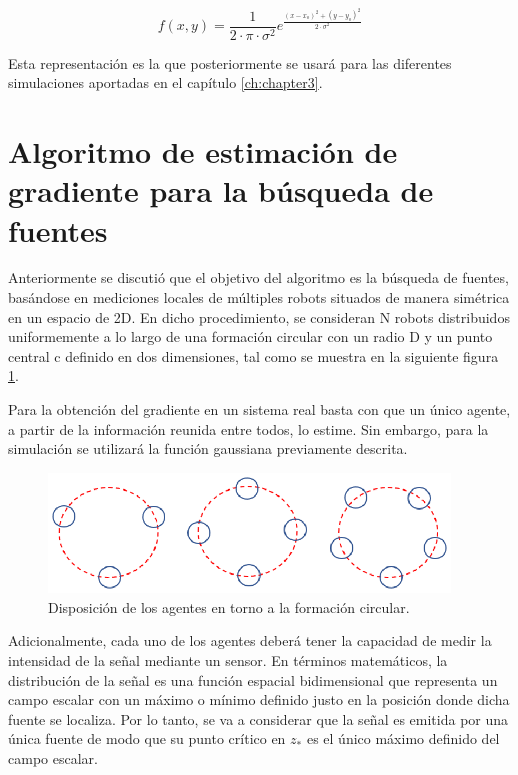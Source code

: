 \begin{equation}
	f\left(x,y\right)=\frac{1}{2\cdot{\pi}\cdot{\sigma^{2}}}e^{\frac{\left(x-x_{o}\right)^{2}+\left(y-y_{o}\right)^{2}}{2\cdot{\sigma^2}}}
\end{equation}

Esta representación es la que posteriormente se usará para las diferentes simulaciones aportadas en el capítulo \ref{ch:chapter3}. 

\section{Algoritmo de estimación de gradiente para la búsqueda de fuentes} \label{Estima}

Anteriormente se discutió que el objetivo del algoritmo es la búsqueda de fuentes, basándose en mediciones locales de múltiples robots situados de manera simétrica en un espacio de 2D. En dicho procedimiento, se consideran N robots distribuidos uniformemente a lo largo de una formación circular con un radio D y un punto central c definido en dos dimensiones, tal como se muestra en la siguiente figura \ref{Disp:Robots}.

Para la obtención del gradiente en un sistema real basta con que un único agente, a partir de la información reunida entre todos, lo estime. Sin embargo, para la simulación se utilizará la función gaussiana previamente descrita.

\begin{figure}[htb]
\centering
\includegraphics[width=0.95\textwidth]{figures/Disposicion_Robots.eps}
\caption{Disposición de los agentes en torno a la formación circular.} \label{Disp:Robots}
\end{figure}

Adicionalmente, cada uno de los agentes deberá tener la capacidad de medir la intensidad de la señal mediante un sensor. En términos matemáticos, la distribución de la señal es una función espacial bidimensional que representa un campo escalar con un máximo o mínimo definido justo en la posición donde dicha fuente se localiza. Por lo tanto, se va a considerar que la señal es emitida por una única fuente de modo que su punto crítico en $z_*$ es el único máximo definido del campo escalar.

